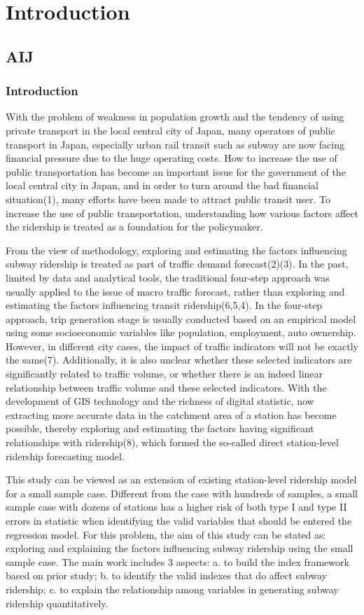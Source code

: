 \chapter{Introduction}
\section{AIJ}
\subsection{Introduction}
With the problem of weakness in population growth and the tendency of using private transport in the local central city of Japan, many operators of public transport in Japan, especially urban rail transit such as subway are now facing financial pressure due to the huge operating costs. How to increase the use of public transportation has become an important issue for the government of the local central city in Japan, and in order to turn around the bad financial situation(1), many efforts have been made to attract public transit user. To increase the use of public transportation, understanding how various factors affect the ridership is treated as a foundation for the policymaker.

From the view of methodology, exploring and estimating the factors influencing subway ridership is treated as part of traffic demand forecast(2)(3). In the past, limited by data and analytical tools, the traditional four-step approach was usually applied to the issue of macro traffic forecast, rather than exploring and estimating the factors influencing transit ridership(6,5,4). In the four-step approach, trip generation stage is usually conducted based on an empirical model using some socioeconomic variables like population, employment, auto ownership. However, in different city cases, the impact of traffic indicators will not be exactly the same(7). Additionally, it is also unclear whether these selected indicators are significantly related to traffic volume, or whether there is an indeed linear relationship between traffic volume and these selected indicators.
With the development of GIS technology and the richness of digital statistic, now extracting more accurate data in the catchment area of a station has become possible, thereby exploring and estimating the factors having significant relationships with ridership(8), which formed the so-called direct station-level ridership forecasting model.

This study can be viewed as an extension of existing station-level ridership model for a small sample case. Different from the case with hundreds of samples, a small sample case with dozens of stations has a higher risk of both type I and type II errors in statistic when identifying the valid variables that should be entered the regression model. For this problem, the aim of this study can be stated as: exploring and explaining the factors influencing subway ridership using the small sample case. The main work includes 3 aspects: a. to build the index framework based on prior study; b. to identify the valid indexes that do affect subway ridership; c. to explain the relationship among variables in generating subway ridership quantitatively.

